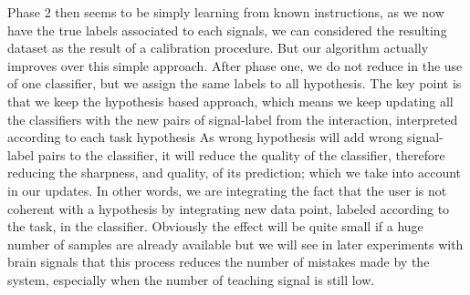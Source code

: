 Phase 2 then seems to be simply learning from known instructions, as we now have the true labels associated to each signals, we can considered the resulting dataset as the result of a calibration procedure. But our algorithm actually improves over this simple approach. After phase one, we do not reduce in the use of one classifier, but we assign the same labels to all hypothesis. The key point is that we keep the hypothesis based approach, which means we keep updating all the classifiers with the new pairs of signal-label from the interaction, interpreted according to each task hypothesis As wrong hypothesis will add wrong signal-label pairs to the classifier, it will reduce the quality of the classifier, therefore reducing the sharpness, and quality, of its prediction; which we take into account in our updates. In other words, we are integrating the fact that the user is not coherent with a hypothesis by integrating new data point, labeled according to the task, in the classifier. Obviously the effect will be quite small if a huge number of samples are already available but we will see in later experiments with brain signals that this process reduces the number of mistakes made by the system, especially when the number of teaching signal is still low.



\transition

